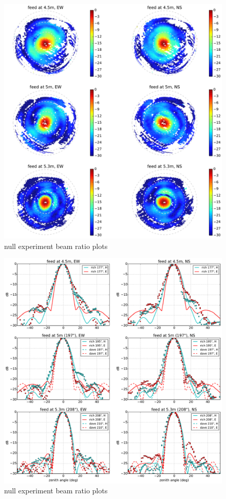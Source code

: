 \documentclass[preprint]{aastex}
\begin{document}
\begin{figure}[t]
\centering
\includegraphics[width=6.5in]{measured_beams_and_models_maps.pdf}
\caption{null experiment beam ratio plots}
\label{fig:measuredbeammaps}
\end{figure}

\begin{figure}[t]
\centering
\includegraphics[width=6.5in]{measured_beams_and_models_slices.pdf}
\caption{null experiment beam ratio plots}
\label{fig:measuredbeamslices}
\end{figure}
\end{document}
